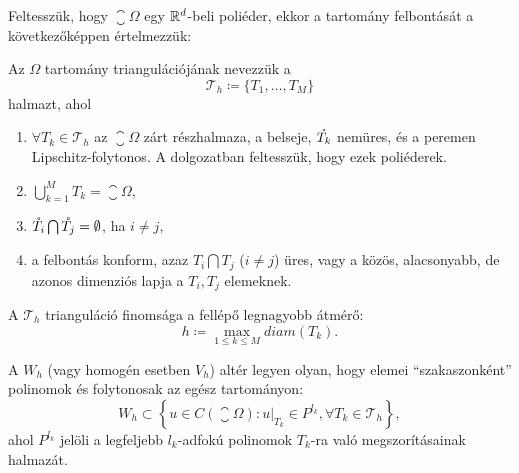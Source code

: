 Feltesszük, hogy $\closure{\Omega}$ egy $\mathbb{R}^d$-beli poliéder, ekkor  a tartomány felbontását a következőképpen értelmezzük:

\begin{definition}
	Az $\Omega$ tartomány triangulációjának nevezzük a 
	\begin{equation*}
		\mathcal{T}_h \coloneqq \{ T_1, \ldots, T_M \}
	\end{equation*}
	halmazt, ahol
	\begin{enumerate}[label=(\roman*)]
		\item $\forall T_k \in \mathcal{T}_h $ az $\closure{\Omega}$ zárt részhalmaza, a belseje, $\mathring{T_k}$ nemüres, és a peremen  Lipschitz-folytonos. A dolgozatban feltesszük, hogy ezek poliéderek.
		\item $\displaystyle  \bigcup_{k=1}^{M} T_k = \closure{\Omega}$,
		\item $\mathring{T_i} \bigcap \mathring{T_j} = \emptyset$, ha $i \neq j$,
		\item a felbontás konform, azaz $T_i \bigcap T_j$ ($i \neq j$) üres, vagy a közös, alacsonyabb, de azonos dimenziós lapja a $T_i, T_j$ elemeknek.
	\end{enumerate}
\end{definition}

\begin{definition}\label{def:finomság}
	A $\mathcal{T}_h$ trianguláció finomsága a fellépő legnagyobb átmérő:
	\begin{equation*}
		h \coloneqq \max_{1 \leq k \leq M} diam(T_k).		
	\end{equation*}
\end{definition}

A $W_h$ (vagy homogén esetben $V_h$) altér legyen olyan, hogy elemei ``szakaszonként'' polinomok és folytonosak az egész tartományon:
\begin{equation*}
	W_h \subset \left\{ u \in C(\closure{\Omega}): u|_{T_k} \in P^{l_k}, \forall T_k \in \mathcal{T}_h  \right\},
\end{equation*}
ahol $P^{l_k}$ jelöli a legfeljebb $l_k$-adfokú polinomok $T_k$-ra való megszorításainak halmazát.

